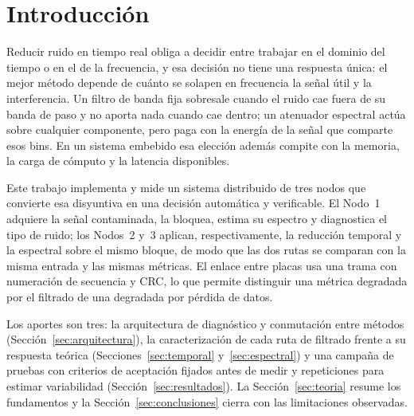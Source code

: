 \section{Introducción}
\label{sec:introduccion}
Reducir ruido en tiempo real obliga a decidir entre trabajar en el dominio del
tiempo o en el de la frecuencia, y esa decisión no tiene una respuesta única: el
mejor método depende de cuánto se solapen en frecuencia la señal útil y la
interferencia. Un filtro de banda fija sobresale cuando el ruido cae fuera de su
banda de paso y no aporta nada cuando cae dentro; un atenuador espectral actúa
sobre cualquier componente, pero paga con la energía de la señal que comparte
esos bins. En un sistema embebido esa elección además compite con la memoria, la
carga de cómputo y la latencia disponibles.

Este trabajo implementa y mide un sistema distribuido de tres nodos que convierte
esa disyuntiva en una decisión automática y verificable. El Nodo~1 adquiere la
señal contaminada, la bloquea, estima su espectro y diagnostica el tipo de ruido;
los Nodos~2 y~3 aplican, respectivamente, la reducción temporal y la espectral
sobre el mismo bloque, de modo que las dos rutas se comparan con la misma entrada
y las mismas métricas. El enlace entre placas usa una trama con numeración de
secuencia y CRC, lo que permite distinguir una métrica degradada por el filtrado
de una degradada por pérdida de datos.

Los aportes son tres: la arquitectura de diagnóstico y conmutación entre métodos
(Sección~\ref{sec:arquitectura}), la caracterización de cada ruta de filtrado
frente a su respuesta teórica (Secciones~\ref{sec:temporal}
y~\ref{sec:espectral}) y una campaña de pruebas con criterios de aceptación
fijados antes de medir y repeticiones para estimar variabilidad
(Sección~\ref{sec:resultados}). La Sección~\ref{sec:teoria} resume los
fundamentos y la Sección~\ref{sec:conclusiones} cierra con las limitaciones
observadas.
